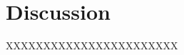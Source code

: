 \documentclass{article}
\begin{document}
\section{Discussion}
XXXXXXXXXXXXXXXXXXXXXXX




\printbibliography
\end{document}
